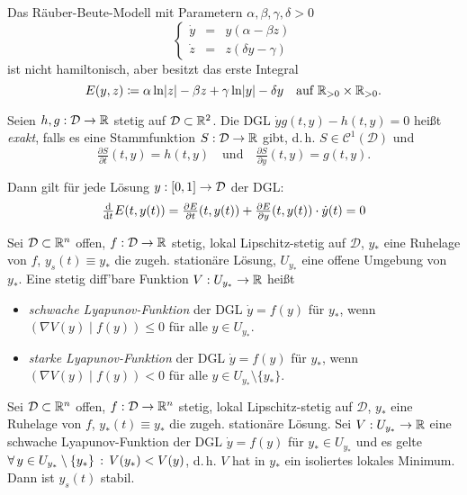 \documentclass{cheat-sheet}
\newcommand{\D}{\mathcal{D}}
\newcommand{\scp}[2]{\left( #1 \!\mid\! #2 \right)} %
\begin{document}

\begin{bsp}
  Das Räuber-Beute-Modell mit Parametern $\alpha, \beta, \gamma, \delta > 0$
  \[
    \left\{ \begin{array}{lll}
      \dot{y} &= & y (\alpha - \beta z) \\
      \dot{z} &= & z (\delta y - \gamma)
    \end{array} \right.
  \]
  ist nicht hamiltonisch, aber besitzt das erste Integral
  \[
    E(y, z) \coloneqq \alpha \ln \lvert z\rvert - \beta z + \gamma \ln \lvert y\rvert - \delta y
    \quad \text{auf } \mathbb{R}_{>0} \times \mathbb{R}_{>0}.
  \]
\end{bsp}

\begin{defn}
  Seien $h, g : \D \to \R$ stetig auf $\D \subset \R^2$. Die DGL $\dot{y} g(t, y) - h(t, y) = 0$ heißt \emph{exakt}, falls es eine Stammfunktion $S : \D \to \R$ gibt, d.\,h. $S \in \mathcal{C}^1(\D)$ und
  \[
    \tfrac{\partial S}{\partial t} (t, y) = h(t, y)
    \quad \text{und} \quad
    \tfrac{\partial S}{\partial y} (t, y) = g(t, y).
  \]
\end{defn}

\begin{bem}
  Dann gilt für jede Lösung $y : \I \to \D$ der DGL:
  \[
    \tfrac{\d}{\d t} E(t, y(t)) = \tfrac{\partial E}{\partial t} (t, y(t)) + \tfrac{\partial E}{\partial y} (t, y(t)) \cdot \dot{y}(t) = 0 %
  \]
\end{bem}


\begin{defn}
  Sei $\D \subset \R^n$ offen, $f : \D \to \R$ stetig, lokal Lipschitz-stetig auf $\D$, $y_{*}$ eine Ruhelage von $f$, $y_s(t) \equiv y_{*}$ die zugeh. stationäre Lösung, $U_{y_{*}}$ eine offene Umgebung von $y_{*}$. Eine stetig diff'bare Funktion $V : U_{y_{*}} \to \mathbb{R}$ heißt
  \begin{itemize}
    \item \emph{schwache Lyapunov-Funktion} der DGL $\dot{y} = f(y)$ für $y_{*}$, wenn $\scp{\nabla V(y)}{f(y)} \leq 0$ für alle $y \in U_{y_{*}}$.
    \item \emph{starke Lyapunov-Funktion} der DGL $\dot{y} = f(y)$ für $y_{*}$, wenn $\scp{\nabla V(y)}{f(y)} < 0$ für alle $y \in U_{y_{*}} \setminus \{ y_{*} \}$.
  \end{itemize}
\end{defn}

\begin{satz}
  Sei $\D \subset \R^n$ offen, $f : \D \to \R^n$ stetig, lokal Lipschitz-stetig auf $\D$, $y_{*}$ eine Ruhelage von $f$, $y_{*}(t) \equiv y_{*}$ die zugeh. stationäre Lösung. Sei $V : U_{y_{*}} \to \mathbb{R}$ eine schwache Lyapunov-Funktion der DGL $\dot{y} = f(y)$ für $y_{*} \in U_{y_{*}}$ und es gelte $\forall \, {y \in U_{y_{*}} \setminus \{ y_{*} \}} \,:\, V(y_{*}) < V(y)$, d.\,h. $V$ hat in $y_{*}$ ein isoliertes lokales Minimum. Dann ist $y_s(t)$ stabil.
\end{satz}
\end{document}
